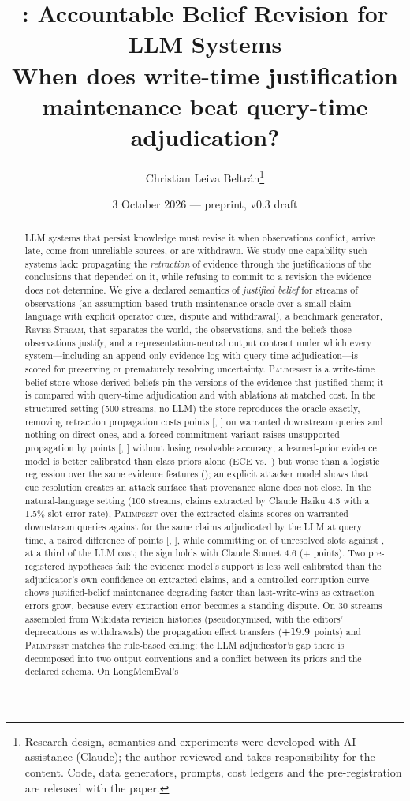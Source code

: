 \documentclass[11pt]{article}
\title{\pal: Accountable Belief Revision for LLM Systems\\
\large When does write-time justification maintenance beat query-time adjudication?}
\author{Christian Leiva Beltr\'an\thanks{Research design, semantics and experiments were developed with AI assistance (Claude); the author reviewed and takes responsibility for the content. Code, data generators, prompts, cost ledgers and the pre-registration are released with the paper.}}
\date{3 October 2026 --- preprint, v0.3 draft}
\newcommand{\pal}{\textsc{Palimpsest}}
\newcommand{\rs}{\textsc{Revise-Stream}}
\begin{document}
\maketitle

\begin{abstract}
LLM systems that persist knowledge must revise it when observations conflict, arrive late, come from unreliable sources, or are withdrawn. We study one capability such systems lack: propagating the \emph{retraction} of evidence through the justifications of the conclusions that depended on it, while refusing to commit to a revision the evidence does not determine. We give a declared semantics of \emph{justified belief} for streams of observations (an assumption-based truth-maintenance oracle over a small claim language with explicit operator cues, dispute and withdrawal), a benchmark generator, \rs, that separates the world, the observations, and the beliefs those observations justify, and a representation-neutral output contract under which every system---including an append-only evidence log with query-time adjudication---is scored for preserving or prematurely resolving uncertainty. \pal{} is a write-time belief store whose derived beliefs pin the versions of the evidence that justified them; it is compared with query-time adjudication and with ablations at matched cost. In the structured setting (500 streams, no LLM) the store reproduces the oracle exactly, removing retraction propagation costs \sOnePropEffect{} points [\sOnePropLo, \sOnePropHi] on warranted downstream queries and nothing on direct ones, and a forced-commitment variant raises unsupported propagation by \sOneCommitUnsup{} points [\sOneCommitUnsupLo, \sOneCommitUnsupHi] without losing resolvable accuracy; a learned-prior evidence model is better calibrated than class priors alone (ECE \RqLearnedEce{} vs.\ \RqPriorEce) but worse than a logistic regression over the same evidence features (\RqLogregEce); an explicit attacker model shows that cue resolution creates an attack surface that provenance alone does not close. In the natural-language setting (100 streams, claims extracted by Claude Haiku 4.5 with a 1.5\% slot-error rate), \pal{} over the extracted claims scores \sTwoPalWarr{} on warranted downstream queries against \sTwoLogWarr{} for the same claims adjudicated by the LLM at query time, a paired difference of \sTwoHOne{} points [\sTwoHOneLo, \sTwoHOneHi], while committing on \sTwoPalCommit{} of unresolved slots against \sTwoLogCommit, at a third of the LLM cost; the sign holds with Claude Sonnet 4.6 (+\sStrongHOne{} points). Two pre-registered hypotheses fail: the evidence model's support is less well calibrated than the adjudicator's own confidence on extracted claims, and a controlled corruption curve shows justified-belief maintenance degrading faster than last-write-wins as extraction errors grow, because every extraction error becomes a standing dispute. On 30 streams assembled from Wikidata revision histories (pseudonymised, with the editors' deprecations as withdrawals) the propagation effect transfers ($+19.9$ points) and \pal{} matches the rule-based ceiling; the LLM adjudicator's gap there is decomposed into two output conventions and a conflict between its priors and the declared schema. On LongMemEval's 
\end{abstract}
\end{document}
